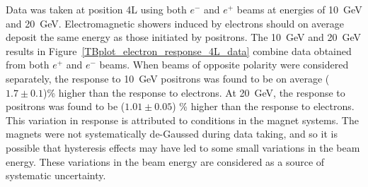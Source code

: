 Data was taken at position 4L using both $e^-$ and $e^+$ beams at energies of 10~GeV and 20~GeV. Electromagnetic showers induced by electrons should on average deposit the same energy as those initiated by positrons. The 10~GeV and 20~GeV results in Figure~\ref{TBplot_electron_response_4L_data} combine data obtained from both $e^+$ and $e^-$ beams. When beams of opposite polarity were considered separately, the response to 10~GeV positrons was found to be on average ($1.7 \pm 0.1$)\% higher than the response to electrons. At 20~GeV, the response to positrons was found to be ($1.01 \pm 0.05$) \% higher than the response to electrons. This variation in response is attributed to conditions in the magnet systems. The magnets were not systematically de-Gaussed during data taking, and so it is possible that hysteresis effects may have led to some small variations in the beam energy. These variations in the beam energy are considered as a source of systematic uncertainty.




%







